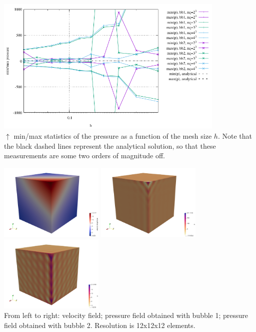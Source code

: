 \begin{center}
\includegraphics[width=11cm]{python_codes/fieldstone_75/results/burst/p_stats.pdf}\\
{\captionfont $\uparrow$ min/max statistics of the pressure as a function of the mesh size $h$. Note that 
the black dashed lines represent the analytical solution, so that these measurements are some two 
orders of magnitude off.}
\end{center}

\begin{center}
\includegraphics[width=5cm]{python_codes/fieldstone_75/results/burst/vel.png}
\includegraphics[width=5cm]{python_codes/fieldstone_75/results/burst/p_b1}
\includegraphics[width=5cm]{python_codes/fieldstone_75/results/burst/p_b2}\\
{\captionfont From left to right: velocity field; pressure field obtained with bubble 1;
pressure field obtained with bubble 2. Resolution is 12x12x12 elements.}
\end{center}


